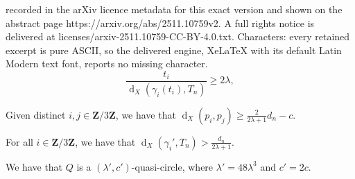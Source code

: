 \documentclass[10pt,a4paper]{amsart}
\DeclareMathOperator{\dist}{d}
\newcommand{\Z}{\mathbf{Z}}
\begin{document}
recorded in the arXiv licence metadata for this exact version and shown on the abstract page https://arxiv.org/abs/2511.10759v2. A full rights notice is delivered at licenses/arxiv-2511.10759-CC-BY-4.0.txt. Characters: every retained excerpt is pure ASCII, so the delivered engine, XeLaTeX with its default Latin Modern text font, reports no missing character.
    \begin{equation}\label{eq:t-i property}
        \frac{t_i}{\dist_X(\gamma_i(t_i), T_n)} \geq 2\lambda, 
    \end{equation}

    \begin{claim}\label{claim:bound-on-pi-dist}
        Given distinct $i , j \in \Z/3\Z$, we have that $\dist_X(p_i,p_j) \geq \frac 2{2\lambda+1} d_n - c$. 
    \end{claim}

    \begin{claim}\label{claim:bound-on-dist-from-gamma-to-Tn}
        For all $i \in \Z/3\Z$, we have that 
        $\dist_X(\gamma_i', T_n) > \frac{d_n}{2\lambda+1}$.
    \end{claim}

    \begin{claim}\label{claim:quasi-circle}
        We have that $Q$ is a $(\lambda', c')$-quasi-circle, where $\lambda' = 48\lambda^3$ and $c' = 2c$. 
    \end{claim}
\end{document}
